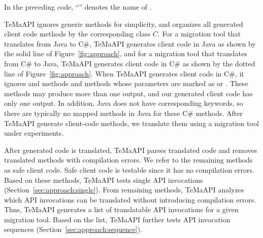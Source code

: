 In the preceding code, ``'' denotes the name of .

TeMaAPI ignores generic methods for simplicity, and organizes all generated client code methods by the corresponding class $C$. For a migration tool that translates from Java to C\#, TeMaAPI generates client code in Java as shown by the solid line of Figure~\ref{fig:approach}, and for a migration tool that translates from C\# to Java, TeMaAPI generates client code in C\# as shown by the dotted line of Figure~\ref{fig:approach}. When TeMaAPI generates client code in C\#, it ignores  and  methods and methods whose parameters are marked as  or . These methods may produce more than one output, and our generated client code has only one output. In addition, Java does not have corresponding keywords, so there are typically no mapped methods in Java for these C\# methods. After TeMaAPI generate client-code methods, we translate them using a migration tool under experiments.

After generated code is translated, TeMaAPI parses translated code and removes translated methods with compilation errors. We refer to the remaining methods as safe client code. Safe client code is testable since it has no compilation errors. Based on these methods, TeMaAPI tests single API invocations (Section~\ref{sec:approach:single}). From remaining methods, TeMaAPI analyzes which API invocations can be translated without introducing compilation errors. Thus, TeMaAPI generates a list of translatable API invocations for a given migration tool. Based on the list, TeMaAPI further tests API invocation sequences (Section~\ref{sec:approach:sequence}).


%


